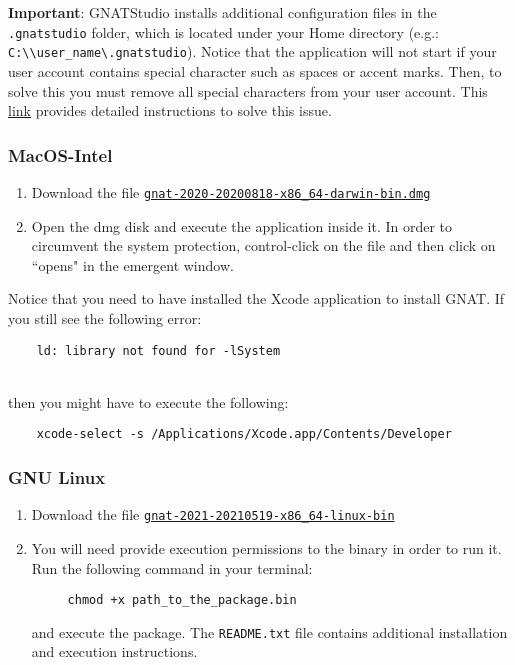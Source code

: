 \textbf{\textcolor{mRedBrown}{Important}}:
GNATStudio installs additional configuration files in the \texttt{.gnatstudio} folder,
which is located under your Home directory (e.g.: \texttt{C:\textbackslash{}\textbackslash{}user\_name\textbackslash{}.gnatstudio}).
Notice that the application will not start if your user account contains special character such as spaces or accent marks.
Then, to solve this you must remove all special characters from your user account.
This 
\href{https://superuser.com/questions/890812/how-to-rename-the-user-folder-in-windows-10/1346983#1346983}
{link}
provides detailed instructions to solve this issue.

\subsubsection*{MacOS-Intel}
\begin{enumerate}
\item Download the file \href{https://community.download.adacore.com/v1/aefa0616b9476874823a7974d3dd969ac13dfe3a?filename=gnat-2020-20200818-x86_64-darwin-bin.dmg&rand=124}{\texttt{gnat-2020-20200818-x86\_64-darwin-bin.dmg}}
\item Open the dmg disk and execute the application inside it.
In order to circumvent the system protection,
control-click on the file and then click on ``opens" in the emergent window.
\end{enumerate}

Notice that you need to have installed the Xcode application to install GNAT.
If you still see the following error:

\begin{BVerbatim}
	ld: library not found for -lSystem
\end{BVerbatim}
\\

then you might have to execute the following:

\begin{BVerbatim}
	xcode-select -s /Applications/Xcode.app/Contents/Developer
\end{BVerbatim}

\subsubsection*{GNU Linux}
\begin{enumerate}
\item Download the file \href{https://community.download.adacore.com/v1/f3a99d283f7b3d07293b2e1d07de00e31e332325?filename=gnat-2021-20210519-x86_64-linux-bin&rand=481}{\texttt{gnat-2021-20210519-x86\_64-linux-bin}}
\item You will need provide execution permissions to the binary in order to run it.
Run the following command in your terminal:

\begin{BVerbatim}
     chmod +x path_to_the_package.bin
\end{BVerbatim}

and execute the package. The \texttt{README.txt} file
contains additional installation and execution instructions.
\end{enumerate}

